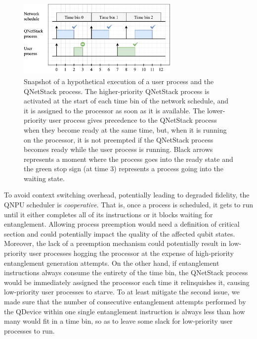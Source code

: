 \begin{figure}
\begin{center}
\includegraphics[width=0.7\textwidth]{figures/qnodeos/supplementary/scheduling-impl.pdf}
\end{center}
\caption[]{Snapshot of a hypothetical execution of a user process and the \ac{QNetStack} process. The higher-priority \ac{QNetStack} process is activated at the start of each time bin of the network schedule, and it is assigned to the processor as soon as it is available. The lower-priority user process gives precedence to the \ac{QNetStack} process when they become ready at the same time, but, when it is running on the processor, it is not preempted if the \ac{QNetStack} process becomes ready while the user process is running. Black arrows represents a moment where the process goes into the ready state and the green stop sign (at time $3$) represents a process going into the waiting state.}
\label{qnodeos:fig:scheduling-impl}
\end{figure}

To avoid context switching overhead, potentially leading to degraded fidelity, the \ac{QNPU} scheduler is \emph{cooperative}. That is, once a process is scheduled, it gets to run until it either completes all of its instructions or it blocks waiting for entanglement. Allowing process preemption would need a definition of critical section and could potentially impact the quality of the affected qubit states. Moreover, the lack of a preemption mechanism could potentially result in low-priority user processes hogging the processor at the expense of high-priority entanglement generation attempts. On the other hand, if entanglement instructions always consume the entirety of the time bin, the \ac{QNetStack} process would be immediately assigned the processor each time it relinquishes it, causing low-priority user processes to starve. To at least mitigate the second issue, we made sure that the number of consecutive entanglement attempts performed by the \ac{QDevice} within one single entanglement instruction is always less than how many would fit in a time bin, so as to leave some slack for low-priority user processes to run.

